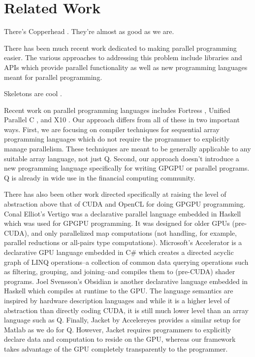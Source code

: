\documentclass[preprint]{sigplanconf}
\begin{document}
\section{Related Work}
\label{RelatedWork}

There's Copperhead \cite{Cata10}.  They're almost as good as we are.

There has been much recent work dedicated to making parallel programming easier.
The various approaches to addressing this problem include libraries and APIs
which provide parallel functionality as well as new programming languages meant
for parallel programming.

Skeletons are cool \cite{Cole04}.

Recent work on parallel programming languages includes Fortress \cite{Alle08},
Unified Parallel C \cite{Char05}, and X10 \cite{Chen05}.  Our approach differs
from all of these in two important ways.  First, we are focusing on compiler
techniques for sequential array programming languages which do not require the
programmer to explicitly manage parallelism.  These techniques are meant to be
generally applicable to any suitable array language, not just Q.  Second, our
approach doesn't introduce a new programming language specifically for writing
GPGPU or parallel programs.  Q is already in wide use in the financial computing
community.

There has also been other work directed specifically at raising the level of
abstraction above that of CUDA and OpenCL for doing GPGPU programming.  Conal
Elliot's Vertigo \cite{Elli04} was a declarative parallel language embedded in
Haskell which was used for GPGPU programming.  It was designed for older GPUs
(pre-CUDA), and only parallelized map computations (not handling, for example,
parallel reductions or all-pairs type computations).  Microsoft's Accelerator
\cite{Tard06} is a declarative GPU language embedded in C\# which creates a
directed acyclic graph of LINQ operations--a collection of common data querying
operations such as filtering, grouping, and joining--and compiles them to
(pre-CUDA) shader programs.  Joel Svensson's Obsidian \cite{Sven08} is another
declarative language embedded in Haskell which compiles at runtime to the GPU.
The language semantics are inspired by hardware description languages and while
it is a higher level of abstraction than directly coding CUDA, it is still much
lower level than an array language such as Q.  Finally, Jacket by Accelereyes
\cite{AcceJa} provides a similar setup for Matlab as we do for Q.  However,
Jacket requires programmers to explicitly declare data and computation to reside
on the GPU, whereas our framework takes advantage of the GPU completely
transparently to the programmer.
\end{document}
